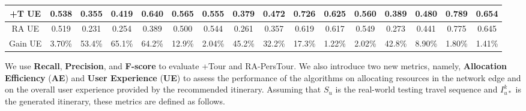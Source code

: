 \begin{table*}[hbt]
\begin{tabular}{c|ccccc|ccccc|ccccc}
+T UE & 0.538 & 0.355 & 0.419 & 0.640 & 0.565 & 0.555 & 0.379 & 0.472 & 0.726 & 0.625 & 0.560 & 0.389 & 0.480 & 0.789 & 0.654 \\\hline
RA UE & 0.519 & 0.231 & 0.254 & 0.389 & 0.500 & 0.544 & 0.261 & 0.357 & 0.619 & 0.617 & 0.549 & 0.273 & 0.441 & 0.775 & 0.645 \\\hline
Gain UE &3.70\%&\hspace{-0.2cm}53.4\%&\hspace{-0.2cm}65.1\%&\hspace{-0.2cm}64.2\% &\hspace{-0.2cm} 12.9\% &\hspace{-0.2cm} 2.04\% &\hspace{-0.2cm} 45.2\% &\hspace{-0.2cm} 32.2\% &\hspace{-0.2cm} 17.3\% &\hspace{-0.2cm} 1.22\% &\hspace{-0.2cm} 2.02\% &\hspace{-0.2cm} 42.8\% &\hspace{-0.2cm} 8.90\% &\hspace{-0.2cm} 1.80\% &\hspace{-0.2cm} 1.41\% \\\hline
\end{tabular}
\end{table*}









We use \textbf{Recall}, \textbf{Precision}, and \textbf{F-score} to evaluate +Tour and RA-PersTour. We also introduce two new metrics, namely, \textbf{Allocation Efficiency} (\textbf{AE}) and \textbf{User Experience} (\textbf{UE}) to assess the performance of the algorithms on allocating resources in the network edge and on the overall user experience provided by the recommended itinerary. Assuming that $S_{u}$ is the real-world testing travel sequence and $I_{u*}^k$ is the generated itinerary, these metrics are defined as follows.

